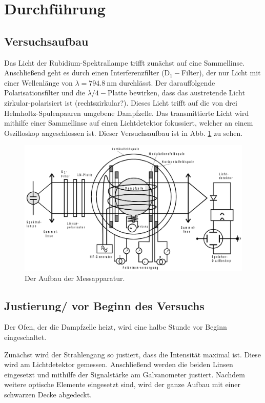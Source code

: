 \section{Durchführung}
\label{sec:Durchführung}

\subsection{Versuchsaufbau}
Das Licht der Rubidium-Spektrallampe trifft zunächst auf eine Sammellinse. Anschließend geht es durch einen Interferenzfilter (D$_1-$Filter), der nur Licht mit einer Wellenlänge von $\lambda = \SI{794.8}{\nano\meter}$ durchlässt. Der darauffolgende Polarisationsfilter und die $\lambda / 4-$Platte bewirken, dass das austretende Licht zirkular-polarisiert ist (rechtszirkular?). Dieses Licht trifft auf die von drei Helmholtz-Spulenpaaren umgebene Dampfzelle. Das transmittierte Licht wird mithilfe einer Sammellinse auf einen Lichtdetektor fokussiert, welcher an einem Oszilloskop angeschlossen ist. \cite{V21}
Dieser Versuchsaufbau ist in Abb. \ref{fig:aufbau} zu sehen.

\begin{figure}
    \centering
    \includegraphics[width=15cm]{fotos/aufbau.png}
    \caption{Der Aufbau der Messapparatur. \cite{V21}}
    \label{fig:aufbau}
\end{figure}

\subsection{Justierung/ vor Beginn des Versuchs}
Der Ofen, der die Dampfzelle heizt, wird eine halbe Stunde vor Beginn eingeschaltet. \cite{V21}

Zunächst wird der Strahlengang so justiert, dass die Intensität maximal ist. Diese wird am Lichtdetektor gemessen.
Anschließend werden die beiden Linsen eingesetzt und mithilfe der Signalstärke am Galvanometer justiert.
Nachdem weitere optische Elemente eingesetzt sind, wird der ganze Aufbau mit einer schwarzen Decke abgedeckt. \cite{V21}

